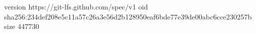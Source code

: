 version https://git-lfs.github.com/spec/v1
oid sha256:234def208e5c11a57c26a3e56d2b128950eaf6bde77e39de00abc6cce230257b
size 447730
